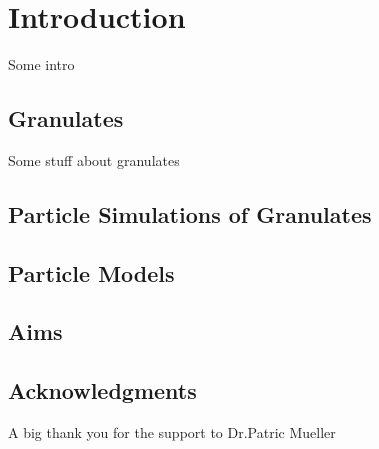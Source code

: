 %
% 


\chapter{Introduction}

Some intro

\section{Granulates}

Some stuff about granulates


\section{Particle Simulations of Granulates}


\section{Particle Models}


\section{Aims}


\section{Acknowledgments}

A big thank you for the support to Dr.Patric Mueller

